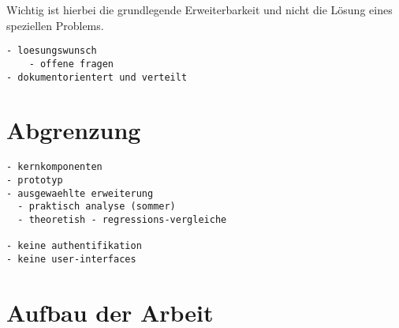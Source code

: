 Wichtig ist hierbei die grundlegende Erweiterbarkeit
und nicht die Lösung eines speziellen Problems.


\begin{verbatim}
- loesungswunsch
    - offene fragen
- dokumentorientert und verteilt
\end{verbatim}

\section{Abgrenzung}

\begin{verbatim}
- kernkomponenten
- prototyp
- ausgewaehlte erweiterung
  - praktisch analyse (sommer)
  - theoretish - regressions-vergleiche

- keine authentifikation
- keine user-interfaces

\end{verbatim}

\section{Aufbau der Arbeit}


